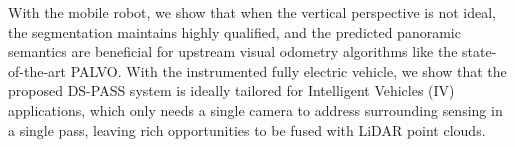 \documentclass[letterpaper, 10 pt, conference]{ieeeconf}
\begin{document}
With the mobile robot, we show that when the vertical perspective is not ideal, the segmentation maintains highly qualified, and the predicted panoramic semantics are beneficial for upstream visual odometry algorithms like the state-of-the-art PALVO. With the instrumented fully electric vehicle, we show that the proposed DS-PASS system is ideally tailored for Intelligent Vehicles (IV) applications, which only needs a single camera to address surrounding sensing in a single pass, leaving rich opportunities to be fused with LiDAR point clouds.







\end{document}
